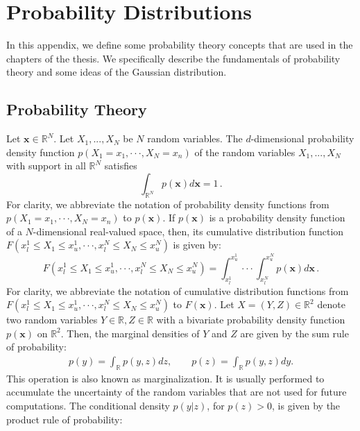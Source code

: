 
\chapter{Probability Distributions}
\label{AppendixA}

In this appendix, we define some probability theory concepts that are used in the chapters of the thesis. We specifically describe the fundamentals of probability theory and some ideas of the Gaussian distribution. 

\section{Probability Theory}
Let $\mathbf{x} \in \mathbb{R}^N$. Let $X_1,...,X_N$ be $N$ random variables. The $d$-dimensional probability density function $p(X_1=x_1, \cdot \cdot \cdot, X_N=x_n)$ of the random variables $X_1,...,X_N$ with support in all $\mathbb{R}^N$ satisfies
\begin{equation}
\int_{\mathbb{R}^N} p(\mathbf{x}) d\mathbf{x} = 1\,.
\end{equation}
For clarity, we abbreviate the notation of probability density functions from $p(X_1=x_1, \cdot \cdot \cdot, X_N=x_n)$ to $p(\mathbf{x})$. If $p(\mathbf{x})$ is a probability density function of a $N$-dimensional real-valued space, then, its cumulative distribution function $F(x_l^{1} \leq X_1 \leq x_u^{1}, \cdot \cdot \cdot, x_l^{N} \leq X_N \leq x_u^{N})$ is given by:
\begin{equation}
F(x_l^{1} \leq X_1 \leq x_u^{1}, \cdot \cdot \cdot, x_l^{N} \leq X_N \leq x_u^{N})  = \int_{x_l^{1}}^{x_u^{1}} \cdot \cdot \cdot \int_{x_l^{N}}^{x_u^{N}} p(\mathbf{x}) d\mathbf{x}\,.
\end{equation}
For clarity, we abbreviate the notation of cumulative distribution functions from $F(x_l^{1} \leq X_1 \leq x_u^{1}, \cdot \cdot \cdot, x_l^{N} \leq X_N \leq x_u^{N})$ to $F(\mathbf{x})$. Let $X = (Y,Z) \in \mathbb{R}^2$ denote two random variables $Y \in \mathbb{R}, Z \in \mathbb{R}$ with a bivariate probability density function $p(\mathbf{x})$ on $\mathbb{R}^2$. Then, the marginal densities of $Y$ and $Z$ are given by the sum rule of probability:
\begin{align}
p(y) = \int_{\mathbb{R}} p(y, z) dz, \quad \quad p(z) = \int_{\mathbb{R}} p(y, z) dy.
\end{align}
This operation is also known as marginalization. It is usually performed to accumulate the uncertainty of the random variables that are not used for future computations. The conditional density $p(y|z)$, for $p(z) > 0$, is given by the product rule of probability:

